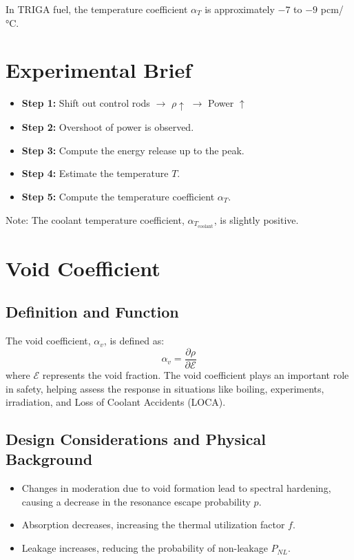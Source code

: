 In TRIGA fuel, the temperature coefficient $\alpha_T$ is approximately $-7$ to $-9$ pcm/°C.

\section{Experimental Brief}
\begin{itemize}
    \item \textbf{Step 1:} Shift out control rods $\rightarrow$ $\rho \uparrow$ $\rightarrow$ Power $\uparrow$
    \item \textbf{Step 2:} Overshoot of power is observed.
    \item \textbf{Step 3:} Compute the energy release up to the peak.
    \item \textbf{Step 4:} Estimate the temperature $T$.
    \item \textbf{Step 5:} Compute the temperature coefficient $\alpha_T$.
\end{itemize}

Note: The coolant temperature coefficient, $\alpha_{T_{\text{coolant}}}$, is slightly positive.

\section{Void Coefficient}

\subsection{Definition and Function}
The void coefficient, $\alpha_v$, is defined as:
\begin{equation}
    \alpha_v = \frac{\partial \rho}{\partial \mathcal{E}}
\end{equation}
where $\mathcal{E}$ represents the void fraction. The void coefficient plays an important role in safety, helping assess the response in situations like boiling, experiments, irradiation, and Loss of Coolant Accidents (LOCA).

\subsection{Design Considerations and Physical Background}
\begin{itemize}
    \item Changes in moderation due to void formation lead to spectral hardening, causing a decrease in the resonance escape probability $p$.
    \item Absorption decreases, increasing the thermal utilization factor $f$.
    \item Leakage increases, reducing the probability of non-leakage $P_{NL}$.
\end{itemize}

